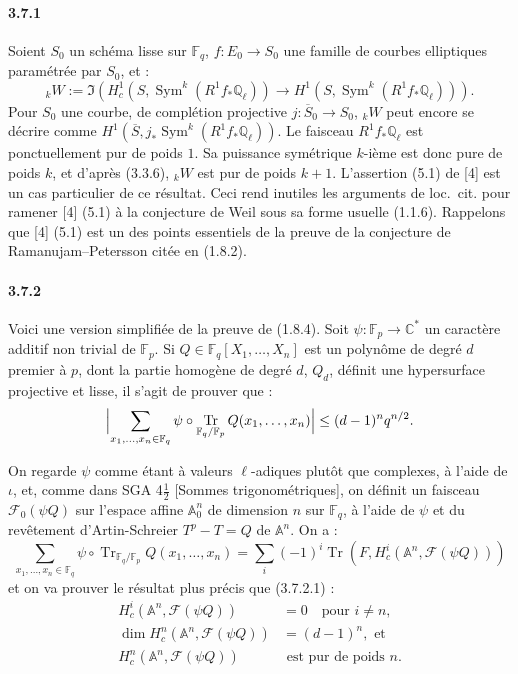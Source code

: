\documentclass[12pt,a4paper]{article}
\theoremstyle{plain}
\theoremstyle{definition}
\theoremstyle{remark}
\DeclareMathOperator{\Sym}{Sym}
\DeclareMathOperator{\Tr}{Tr}
\newcommand{\CC}{{\mathbb{C}}}
\newcommand{\FF}{{\mathbb{F}}}
\newcommand{\QQ}{{\mathbb{Q}}}
\renewcommand{\AA}{\ensuremath{\mathbb{A}}}
\begin{document}
\paragraph{3.7.1}
Soient $S_0$ un sch\'ema lisse sur $\FF_q$, $f : E_0 \to S_0$ une famille de courbes elliptiques param\'etr\'ee par $S_0$, et :
\[ {}_k W := \Im(H_c^1(S, \Sym^k(R^1 f_* \QQ_\ell)) \to H^1(S, \Sym^k(R^1 f_* \QQ_\ell))). \]
Pour $S_0$ une courbe, de compl\'etion projective $j : \overline{S}_0 \to S_0$, ${}_k W$ peut encore se d\'ecrire comme $H^1(\overline{S}, j_* \Sym^k(R^1 f_* \QQ_\ell))$. Le faisceau $R^1 f_* \QQ_\ell$ est ponctuellement pur de poids $1$. Sa puissance sym\'etrique $k$-i\`eme est donc pure de poids $k$, et d'apr\`es (3.3.6), ${}_k W$ est pur de poids $k + 1$. L'assertion (5.1) de [4] est un cas particulier de ce r\'esultat. Ceci rend inutiles les arguments de loc.~cit. pour ramener [4] (5.1) \`a la conjecture de Weil sous sa forme usuelle (1.1.6). Rappelons que [4] (5.1) est un des points essentiels de la preuve de la conjecture de Ramanujam--Petersson cit\'ee en (1.8.2).


\paragraph{3.7.2}
Voici une version simplifi\'ee de la preuve de (1.8.4). Soit $\psi : \FF_p \to \CC^*$ un caract\`ere additif non trivial de $\FF_p$. Si $Q \in \FF_q[X_1, \ldots, X_n]$ est un polyn\^ome de degr\'e $d$ premier \`a $p$, dont la partie homog\`ene de degr\'e $d$, $Q_d$, d\'efinit une hypersurface projective et lisse, il s'agit de prouver que :
\begin{equation}\label{eq:3.7.2.1}
\Bigl| \sum_{x_1, \ldots, x_n \in \FF_q} \psi \circ \Tr_{\FF_q/\FF_p} Q(x_1, \ldots, x_n) \Bigr| \leq (d-1)^n q^{n/2}.
\end{equation}

On regarde $\psi$ comme \'etant \`a valeurs $\ell$-adiques plut\^ot que complexes, \`a l'aide de $\iota$, et, comme dans SGA 4$\frac{1}{2}$ [Sommes trigonom\'etriques], on d\'efinit un faisceau $\mathscr{F}_0(\psi Q)$ sur l'espace affine $\AA_0^n$ de dimension $n$ sur $\FF_q$, \`a l'aide de $\psi$ et du rev\^etement d'Artin-Schreier $T^p - T = Q$ de $\AA^n$. On a :
\begin{equation}\label{eq:3.7.2.2}
\sum_{x_1, \ldots, x_n \in \FF_q} \psi \circ \Tr_{\FF_q/\FF_p} Q(x_1, \ldots, x_n) = \sum_i (-1)^i \Tr(F, H_c^i(\AA^n, \mathscr{F}(\psi Q)))
\end{equation}
et on va prouver le r\'esultat plus pr\'ecis que (3.7.2.1) :
\begin{equation}\label{eq:3.7.2.3}
\begin{aligned}
H_c^i(\AA^n, \mathscr{F}(\psi Q)) &= 0 \quad \text{pour } i \neq n, \\
\dim H_c^n(\AA^n, \mathscr{F}(\psi Q)) &= (d-1)^n, \text{ et} \\
H_c^n(\AA^n, \mathscr{F}(\psi Q)) &\text{ est pur de poids } n.
\end{aligned}
\end{equation}
\end{document}
